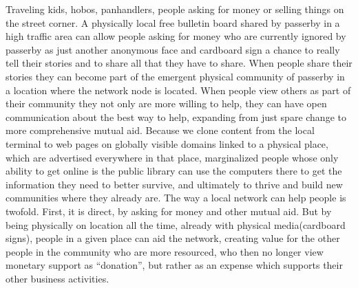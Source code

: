 Traveling kids, hobos, panhandlers, people asking for money or selling things on the street corner.  A physically local free bulletin board shared by passerby in a high traffic area can allow people asking for money who are currently ignored by passerby as just another anonymous face and cardboard sign a chance to really tell their stories and to share all that they have to share.  When people share their stories they can become part of the emergent physical community of passerby in a location where the network node is located.  When people view others as part of their community they not only are more willing to help, they can have open communication about the best way to help, expanding from just spare change to more comprehensive mutual aid.  Because we clone content from the local terminal to web pages on globally visible domains linked to a physical place, which are advertised everywhere in that place, marginalized people whose only ability to get online is the public library can use the computers there to get the information they need to better survive, and ultimately to thrive and build new communities where they already are.  The way a local network can help people is twofold. First, it is direct, by asking for money and other mutual aid.  But by being physically on location all the time, already with physical media(cardboard signs), people in a given place can aid the network, creating value for the other people in the community who are more resourced, who then no longer view monetary support as ``donation'', but rather as an expense which supports their other business activities.  

